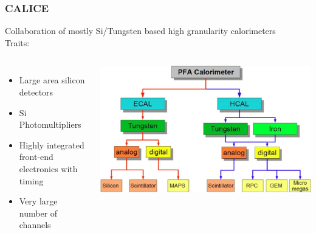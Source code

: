 \documentclass{beamer}
\newcommand{\bluetext}[1]{%
  \textcolor{myBlue}{#1}
}
\begin{document}
\begin{frame}
  \frametitle{CALICE}

  Collaboration of mostly Si/Tungsten based high granularity calorimeters\\[1ex]
  \bluetext{Traits:}
  \begin{columns}[c]
    \begin{itemize}
      \item Large area silicon detectors
      \item Si Photomultipliers
      \item Highly integrated front-end electronics with timing
      \item Very large number of channels
    \end{itemize}

    \includegraphics[width=\linewidth]{figures/CALICE_diagram.png}
  \end{columns}
\end{frame}
\end{document}
